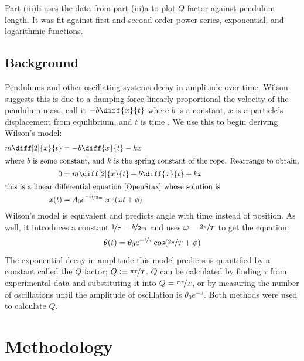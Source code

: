 \documentclass[notitlepage, twocolumn, 12pt]{article}
\begin{document}
    Part (iii)b uses the data from part (iii)a to plot $Q$ factor against pendulum length. It was fit against first and second order power series, exponential, and logarithmic functions.  

    \subsection*{Background}
    \color{WildStrawberry}
    Pendulums and other oscillating systems decay in amplitude over time. Wilson suggests this is due to a damping force linearly proportional the velocity of the pendulum mass, call it $-b\diff{x}{t}$ where $b$ is a constant, $x$ is a particle's displacement from equilibrium, and $t$ is time \cite{OpenStax}. We use this to begin deriving Wilson's model:
    \begin{align*}
        m \diff[2]{x}{t} &= - b \diff{x}{t} - kx \\
        \intertext{where $b$ is some constant, and $k$ is the spring constant of the rope. Rearrange to obtain,}
        0 &= m \diff[2]{x}{t} + b \diff{x}{t} + kx   \\
    \intertext{this is a linear differential equation \cite{OpenStax} whose solution is} 
        x(t) &= A_0e^{\nicefrac{-bt}{2m}}\cos(\omega t + \phi)
    \end{align*} 
    Wilson's model is equivalent and predicts angle with time instead of position. As well, it introduces a constant $\nicefrac{1}{\tau} = \nicefrac{b}{2m}$ and uses $\omega = \nicefrac{2 \pi}{T}$ to get the equation:
    \begin{equation}\label{eq:1}
        \theta(t) = \theta_0 e^{-\nicefrac{t}{\tau}}\cos(\nicefrac{2\pi}{T} + \phi)
    \end{equation}
    The exponential decay in amplitude this model predicts is quantified by a constant called the $Q$ factor;  $Q \vcentcolon= \nicefrac{\pi \tau}{T}$. $Q$ can be calculated by finding $\tau$ from experimental data and substituting it into $Q = \nicefrac{\pi \tau}{T}$, or by measuring the number of oscillations until the amplitude of oscillation is $\theta_0e^{-\pi}$. Both methods were used to calculate $Q$. 
    
    
    \section*{Methodology} \label{method}
\end{document}
